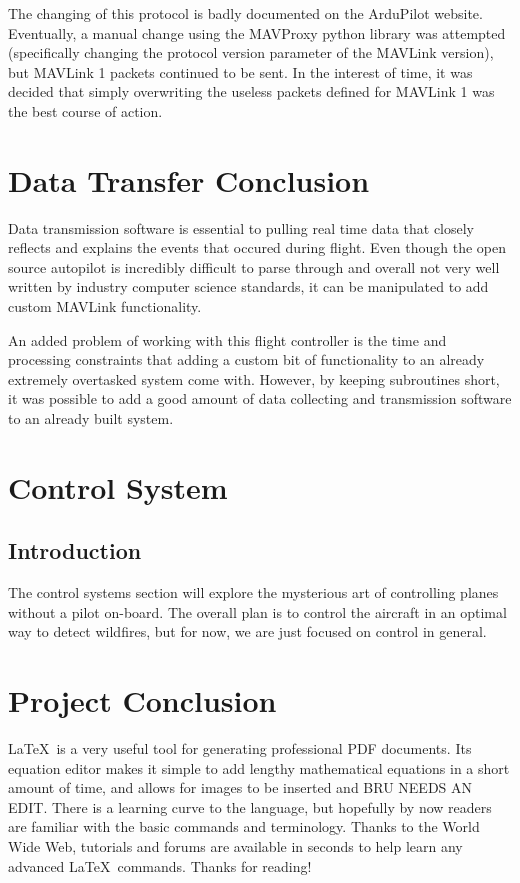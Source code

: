 \documentclass[12pt,journal,compsoc]{IEEEtran}
\begin{document}
The changing of this protocol is badly documented on the ArduPilot website. Eventually, a manual change using the MAVProxy python library was attempted (specifically changing the protocol version parameter of the MAVLink version), but MAVLink 1 packets continued to be sent. In the interest of time, it was decided that simply overwriting the useless packets defined for MAVLink 1 was the best course of action.

\section{Data Transfer Conclusion}
Data transmission software is essential to pulling real time data that closely reflects and explains the events that occured during flight. Even though the open source autopilot is incredibly difficult to parse through and overall not very well written by industry computer science standards, it can be manipulated to add custom MAVLink functionality. 

An added problem of working with this flight controller is the time and processing constraints that adding a custom bit of functionality to an already extremely overtasked system come with. However, by keeping subroutines short, it was possible to add a good amount of data collecting and transmission software to an already built system.

\section{Control System}
\subsection{Introduction}
The control systems section will explore the mysterious art of controlling planes without a pilot on-board. The overall plan is to control the aircraft in an optimal way to detect wildfires, but for now, we are just focused on control in general.

\section{Project Conclusion}
\LaTeX\ is a very useful tool for generating professional PDF documents. Its equation editor makes it simple to add lengthy mathematical equations in a short amount of time, and allows for images to be inserted and BRU NEEDS AN EDIT. There is a learning curve to the language, but hopefully by now readers are familiar with the basic commands and terminology. Thanks to the World Wide Web, tutorials and forums are available in seconds to help learn any advanced \LaTeX\ commands. Thanks for reading!
\end{document}
